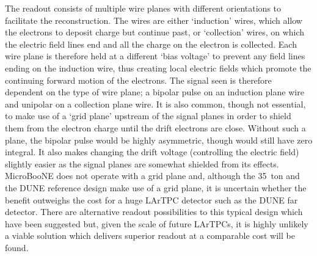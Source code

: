 The readout consists of multiple wire planes with different orientations to facilitate the reconstruction.  The wires are either `induction' wires, which allow the electrons to deposit charge but continue past, or `collection' wires, on which the electric field lines end and all the charge on the electron is collected.  Each wire plane is therefore held at a different `bias voltage' to prevent any field lines ending on the induction wire, thus creating local electric fields which promote the continuing forward motion of the electrons.  The signal seen is therefore dependent on the type of wire plane; a bipolar pulse on an induction plane wire and unipolar on a collection plane wire.  It is also common, though not essential, to make use of a `grid plane' upstream of the signal planes in order to shield them from the electron charge until the drift electrons are close.  Without such a plane, the bipolar pulse would be highly asymmetric, though would still have zero integral.  It also makes changing the drift voltage (controlling the electric field) slightly easier as the signal planes are somewhat shielded from its effects.  MicroBooNE does not operate with a grid plane and, although the 35~ton and the DUNE reference design make use of a grid plane, it is uncertain whether the benefit outweighs the cost for a huge LArTPC detector such as the DUNE far detector.  There are alternative readout possibilities to this typical design which have been suggested but, given the scale of future LArTPCs, it is highly unlikely a viable solution which delivers superior readout at a comparable cost will be found.

